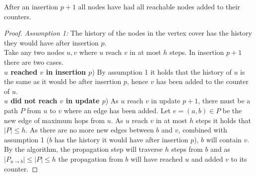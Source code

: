 \begin{lemma} After an insertion $p+1$ all nodes have had all reachable nodes added to their counters.
\label{lemma:propagation}

\begin{proof}

\noindent\textit{Assumption 1: } The history of the nodes in the vertex cover has the history they would have after insertion $p$. \\

\noindent Take any two nodes $u,v$ where $u$ reach $v$ in at most $h$ steps. In insertion $p+1$ there are two cases. \\

\noindent\textbf{$u$ reached $v$ in insertion $p$}) By assumption 1 it holds that the history of $u$ is the same as it would be after insertion $p$, hence $v$ has been added to the counter of $u$.\\

\noindent\textbf{$u$ did not reach $v$ in update $p$}) As $u$ reach $v$ in update $p+1$, there must be a path $P$ from $u$ to $v$ where an edge has been added. Let $e = (a,b) \in P$ be the new edge of maximum hops from $u$. As $u$ reach $v$ in at most $h$ steps it holds that $|P| \leq h$.
As there are no more new edges between $b$ and $v$, combined with assumption 1 ($b$ has the history it would have after insertion $p$), $b$ will contain $v$. By the algorithm, the propagation step will traverse $h$ steps from $b$ and as 
$|P_{u \rightarrow b}| \leq |P| \leq h$ the propagation from $b$ will have reached $u$ and added $v$ to its counter. 

\end{proof}
\end{lemma}

